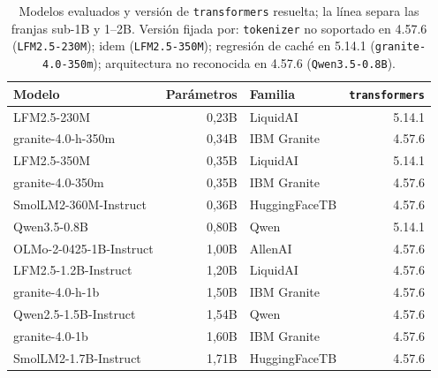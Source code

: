 \begin{table}[htbp]
\centering
\caption{Modelos evaluados y versión de \texttt{transformers} resuelta; la línea separa las franjas sub-1B y 1--2B. Versión fijada por: \texttt{tokenizer} no soportado en 4.57.6 (\texttt{LFM2.5-230M}); idem (\texttt{LFM2.5-350M}); regresión de caché en 5.14.1 (\texttt{granite-4.0-350m}); arquitectura no reconocida en 4.57.6 (\texttt{Qwen3.5-0.8B}).}
\label{tab:modelos}
{\footnotesize
\begin{tabular}{lrlr}
\toprule
Modelo & Parámetros & Familia & \texttt{transformers} \\
\midrule
LFM2.5-230M & 0,23B & LiquidAI & 5.14.1 \\
granite-4.0-h-350m & 0,34B & IBM Granite & 4.57.6 \\
LFM2.5-350M & 0,35B & LiquidAI & 5.14.1 \\
granite-4.0-350m & 0,35B & IBM Granite & 4.57.6 \\
SmolLM2-360M-Instruct & 0,36B & HuggingFaceTB & 4.57.6 \\
Qwen3.5-0.8B & 0,80B & Qwen & 5.14.1 \\
\midrule
OLMo-2-0425-1B-Instruct & 1,00B & AllenAI & 4.57.6 \\
LFM2.5-1.2B-Instruct & 1,20B & LiquidAI & 4.57.6 \\
granite-4.0-h-1b & 1,50B & IBM Granite & 4.57.6 \\
Qwen2.5-1.5B-Instruct & 1,54B & Qwen & 4.57.6 \\
granite-4.0-1b & 1,60B & IBM Granite & 4.57.6 \\
SmolLM2-1.7B-Instruct & 1,71B & HuggingFaceTB & 4.57.6 \\
\bottomrule
\end{tabular}
}
\end{table}
